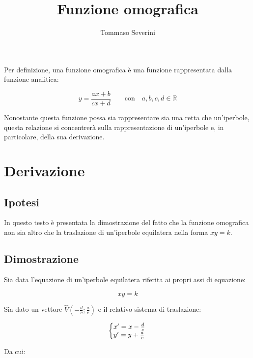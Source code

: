 \documentclass[10pt,a4paper]{article}
\author{Tommaso Severini}
\title{Funzione omografica}
\date{}
\begin{document}
	\maketitle
	
	\thispagestyle{empty}
	
	Per definizione, una funzione omografica è una funzione rappresentata dalla funzione analitica:
	
	\begin{equation*}
		y = \frac{ax+b}{cx+d}	\qquad	\text{con} \quad a,b,c,d \in \mathbb{R} 
	\end{equation*}

	Nonostante questa funzione possa sia rappresentare sia una retta che un'iperbole, questa relazione si concentrerà sulla rappresentazione di un'iperbole e, in particolare, della sua derivazione.
	
	\section*{Derivazione}
	
	\subsection*{Ipotesi}
	
	In questo testo è presentata la dimostrazione del fatto che la funzione omografica non sia altro che la traslazione di un'iperbole equilatera nella forma $xy = k$.
	
	\subsection*{Dimostrazione}
	
	Sia data l'equazione di un'iperbole equilatera riferita ai propri assi di equazione:
	
	\begin{equation}
		xy = k
	\end{equation}

	Sia dato un vettore $\hat{V} (-\frac{d}{c}; \frac{a}{c})$ e il relativo sistema di traslazione:
	
	\begin{equation*}
		\left\{\begin{array}{@{}l@{}}
			x' = x-\frac{d}{c}\\
			y' = y+\frac{a}{c}
		\end{array}\right.\,
	\end{equation*}

	Da cui:
	
\end{document}
